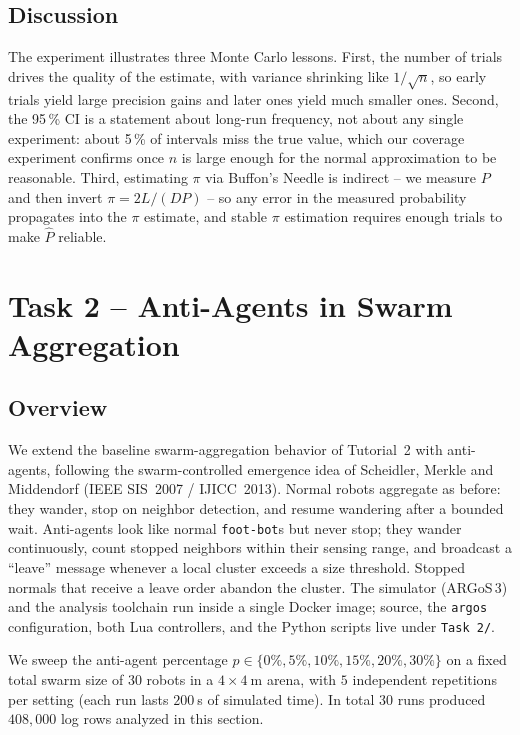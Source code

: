 \documentclass[12pt, a4paper]{article}
\begin{document}
\subsection{Discussion}

The experiment illustrates three Monte Carlo lessons.  First, the number of
trials drives the quality of the estimate, with variance shrinking like
$1/\sqrt{n}$, so early trials yield large precision gains and later ones
yield much smaller ones.  Second, the 95\,\% CI is a statement about
long-run frequency, not about any single experiment: about 5\,\% of
intervals miss the true value, which our coverage experiment confirms once
$n$ is large enough for the normal approximation to be reasonable.  Third,
estimating $\pi$ via Buffon's Needle is indirect -- we measure $P$ and then
invert $\pi = 2L/(DP)$ -- so any error in the measured probability propagates
into the $\pi$ estimate, and stable $\pi$ estimation requires enough trials to
make $\hat P$ reliable.

\newpage
\section{Task 2 -- Anti-Agents in Swarm Aggregation}

\subsection{Overview}

We extend the baseline swarm-aggregation behavior of Tutorial~2 with
anti-agents, following the swarm-controlled emergence idea of
Scheidler, Merkle and Middendorf (IEEE SIS~2007 / IJICC~2013).  Normal robots
aggregate as before: they wander, stop on neighbor detection, and resume
wandering after a bounded wait.  Anti-agents look like normal
\texttt{foot-bot}s but never stop; they wander continuously, count stopped
neighbors within their sensing range, and broadcast a ``leave'' message
whenever a local cluster exceeds a size threshold.  Stopped normals that
receive a leave order abandon the cluster.  The simulator (ARGoS\,3) and the
analysis toolchain run inside a single Docker image; source, the
\texttt{argos} configuration, both Lua controllers, and the Python scripts
live under \texttt{Task~2/}.

We sweep the anti-agent percentage
$p \in \{0\%, 5\%, 10\%, 15\%, 20\%, 30\%\}$ on a fixed total swarm size of
$30$ robots in a $4 \times 4~$m arena, with $5$ independent repetitions per
setting (each run lasts $200~$s of simulated time).  In total $30$ runs
produced $408{,}000$ log rows analyzed in this section.
\end{document}
